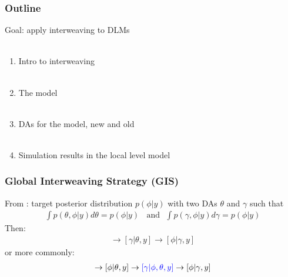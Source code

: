 \documentclass[xcolor=dvipsnames]{beamer}
\begin{document}
\begin{frame}
  \frametitle{Outline}
  Goal: apply interweaving to DLMs\\~\\
  \begin{enumerate}
    \item Intro to interweaving\\~\\
    \item The model\\~\\
    \item DAs for the model, new and old\\~\\
    \item Simulation results in the local level model
  \end{enumerate}
\end{frame}

\begin{frame}
\frametitle{Global Interweaving Strategy (GIS)}
From \citet{yu2011center}: target posterior distribution $p(\phi|y)$ with two DAs $\theta$ and $\gamma$ such that
\begin{align*}
\int p(\theta,\phi|y) d\theta = p(\phi|y) \ \ \ \ \mbox{and}\ \ \ \int p(\gamma,\phi|y) d\gamma = p(\phi|y) 
\end{align*}
Then:
\begin{align*}
[\theta|\phi,y] \to [\gamma|\theta,y] \to [\phi|\gamma,y]
\end{align*}
or more commonly:
\begin{align*}
[\theta|\phi,y] \to [\phi|\theta,y] \to {\color{blue}[\gamma|\phi,\theta,y]} \to [\phi|\gamma,y]
\end{align*}
\end{frame}
\end{document}
